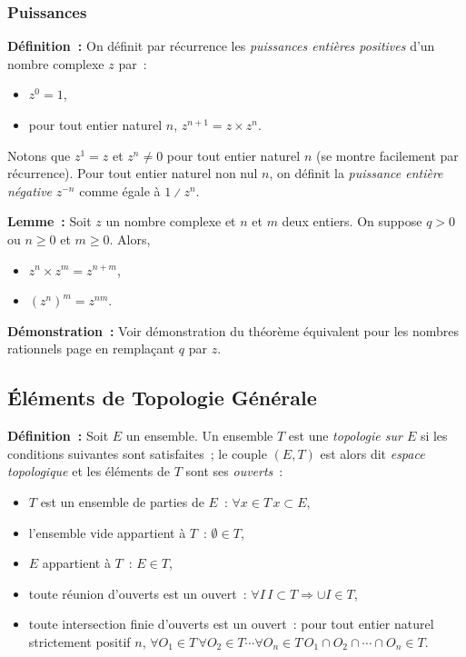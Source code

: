\subsubsection{Puissances}

\noindent\textbf{Définition :} On définit par récurrence les \emph{puissances entières positives} d'un nombre complexe $z$ par :
    \begin{itemize}[nosep]
        \item $z^0 = 1$,
        \item pour tout entier naturel $n$, $z^{n+1} = z \times z^n$.
    \end{itemize}
    Notons que $z^1 = z$ et $z^n \neq 0$ pour tout entier naturel $n$ (se montre facilement par récurrence).
    Pour tout entier naturel non nul $n$, on définit la \emph{puissance entière négative} $z^{-n}$ comme égale à $1 \divslash z^n$.

\medskip

\noindent\textbf{Lemme :} Soit $z$ un nombre complexe et $n$ et $m$ deux entiers. 
    On suppose $q > 0$ ou $n \geq 0$ et $m \geq 0$.
    Alors, 
    \begin{itemize}[nosep]
        \item $z^n \times z^m = z^{n+m}$,
        \item $(z^n)^m = z^{n m}$.
    \end{itemize}

\medskip

\noindent\textbf{Démonstration :} Voir démonstration du théorème équivalent pour les nombres rationnels page \pageref{demo:rel_puissances_q} en remplaçant $q$ par $z$.

\subsection{Éléments de Topologie Générale}

\noindent\textbf{Définition :} Soit $E$ un ensemble.
    Un ensemble $T$ est une \emph{topologie sur $E$} si les conditions suivantes sont satisfaites ; le couple $(E, T)$ est alors dit \emph{espace topologique} et les éléments de $T$ sont ses \emph{ouverts} :
    \begin{itemize}[nosep]
        \item $T$ est un ensemble de parties de $E$ : $\forall x \in T \, x \subset E$,
        \item l'ensemble vide appartient à $T$ : $\emptyset \in T$,
        \item $E$ appartient à $T$ : $E \in T$,
        \item toute réunion d'ouverts est un ouvert : $\forall I \, I \subset T \Rightarrow \cup I \in T$,
        \item toute intersection finie d'ouverts est un ouvert : pour tout entier naturel strictement positif $n$, $\forall O_1 \in T \, \forall O_2 \in T \cdots \forall O_n \in T \, O_1 \cap O_2 \cap \cdots \cap O_n \in T$.
    \end{itemize}

